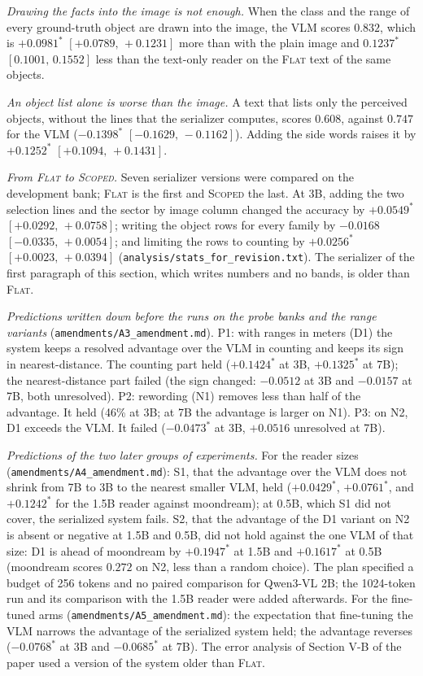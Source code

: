 \documentclass[10pt]{article}
\begin{document}
\emph{Drawing the facts into the image is not enough.} When the class and the range of every ground-truth object are drawn into the image, the VLM scores $0.832$, which is $+0.0981^{*}$ $[+0.0789,\,+0.1231]$ more than with the plain image and $0.1237^{*}$ $[0.1001,\,0.1552]$ less than the text-only reader on the \textsc{Flat} text of the same objects.

\emph{An object list alone is worse than the image.} A text that lists only the perceived objects, without the lines that the serializer computes, scores $0.608$, against $0.747$ for the VLM ($-0.1398^{*}$ $[-0.1629,\,-0.1162]$). Adding the side words raises it by $+0.1252^{*}$ $[+0.1094,\,+0.1431]$.

\emph{From \textsc{Flat} to \textsc{Scoped}.} Seven serializer versions were compared on the development bank; \textsc{Flat} is the first and \textsc{Scoped} the last. At 3B, adding the two selection lines and the sector by image column changed the accuracy by $+0.0549^{*}$ $[+0.0292,\,+0.0758]$; writing the object rows for every family by $-0.0168$ $[-0.0335,\,+0.0054]$; and limiting the rows to counting by $+0.0256^{*}$ $[+0.0023,\,+0.0394]$ (\texttt{analysis/stats\_for\_revision.txt}). The serializer of the first paragraph of this section, which writes numbers and no bands, is older than \textsc{Flat}.

\emph{Predictions written down before the runs on the probe banks and the range variants} (\texttt{amendments/A3\_amendment.md}). P1: with ranges in meters (D1) the system keeps a resolved advantage over the VLM in counting and keeps its sign in nearest-distance. The counting part held ($+0.1424^{*}$ at 3B, $+0.1325^{*}$ at 7B); the nearest-distance part failed (the sign changed: $-0.0512$ at 3B and $-0.0157$ at 7B, both unresolved). P2: rewording (N1) removes less than half of the advantage. It held (46\% at 3B; at 7B the advantage is larger on N1). P3: on N2, D1 exceeds the VLM. It failed ($-0.0473^{*}$ at 3B, $+0.0516$ unresolved at 7B).

\emph{Predictions of the two later groups of experiments.} For the reader sizes (\texttt{amendments/A4\_amendment.md}): S1, that the advantage over the VLM does not shrink from 7B to 3B to the nearest smaller VLM, held ($+0.0429^{*}$, $+0.0761^{*}$, and $+0.1242^{*}$ for the 1.5B reader against moondream); at 0.5B, which S1 did not cover, the serialized system fails. S2, that the advantage of the D1 variant on N2 is absent or negative at 1.5B and 0.5B, did not hold against the one VLM of that size: D1 is ahead of moondream by $+0.1947^{*}$ at 1.5B and $+0.1617^{*}$ at 0.5B (moondream scores $0.272$ on N2, less than a random choice). The plan specified a budget of 256 tokens and no paired comparison for Qwen3-VL 2B; the 1024-token run and its comparison with the 1.5B reader were added afterwards. For the fine-tuned arms (\texttt{amendments/A5\_amendment.md}): the expectation that fine-tuning the VLM narrows the advantage of the serialized system held; the advantage reverses ($-0.0768^{*}$ at 3B and $-0.0685^{*}$ at 7B). The error analysis of Section V-B of the paper used a version of the system older than \textsc{Flat}.
\end{document}
